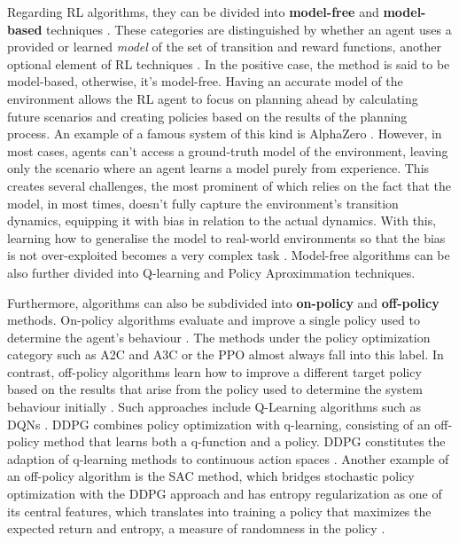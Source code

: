 Regarding \ac{RL} algorithms, they can be divided into \textbf{model-free} and \textbf{model-based} techniques \cite{openaiSpinningDocumentation}. These categories are distinguished by whether an agent uses a provided or learned \textit{model} of the set of transition and reward functions, another optional element of \ac{RL} techniques \cite{moralesGrokkingDeepReinforcement2020, openaiSpinningDocumentation}. In the positive case, the method is said to be model-based, otherwise, it's model-free. Having an accurate model of the environment allows the \ac{RL} agent to focus on planning ahead by calculating future scenarios and creating policies based on the results of the planning process. An example of a famous system of this kind is AlphaZero \cite{silverMasteringChessShogi2017}. However, in most cases, agents can't access a ground-truth model of the environment, leaving only the scenario where an agent learns a model purely from experience. This creates several challenges, the most prominent of which relies on the fact that the model, in most times, doesn't fully capture the environment's transition dynamics, equipping it with bias in relation to the actual dynamics. With this, learning how to generalise the model to real-world environments so that the bias is not over-exploited becomes a very complex task \cite{openaiSpinningDocumentation}.  Model-free algorithms can be also further divided into Q-learning and Policy Aproximmation techniques. \par
Furthermore, algorithms can also be subdivided into \textbf{on-policy} and \textbf{off-policy} methods. \cite{moralesGrokkingDeepReinforcement2020} On-policy algorithms evaluate and improve a single policy used to determine the agent's behaviour \cite{moralesGrokkingDeepReinforcement2020}. The methods under the policy optimization category such as A2C and A3C \cite{mnihAsynchronousMethodsDeep2016} or the \ac{PPO} \cite{schulmanProximalPolicyOptimization2017} almost always fall into this label. In contrast, off-policy algorithms learn how to improve a different target policy based on the results that arise from the policy used to determine the system behaviour initially \cite{moralesGrokkingDeepReinforcement2020}. Such approaches include Q-Learning algorithms such as \acp{DQN} \cite{mnihHumanlevelControlDeep2015, openaiSpinningDocumentation}. \ac{DDPG} \cite{lillicrapContinuousControlDeep2019} combines policy optimization with q-learning, consisting of an off-policy method that learns both a q-function and a policy. \ac{DDPG} constitutes the adaption of q-learning methods to continuous action spaces \cite{openaiSpinningDocumentation}. Another example of an off-policy algorithm is the \ac{SAC} \cite{haarnojaSoftActorCriticOffPolicy2018} method, which bridges stochastic policy optimization with the \ac{DDPG} approach and has entropy regularization as one of its central features, which translates into training a policy that maximizes the expected return and entropy, a measure of randomness in the policy \cite{openaiSpinningDocumentation}. \par
